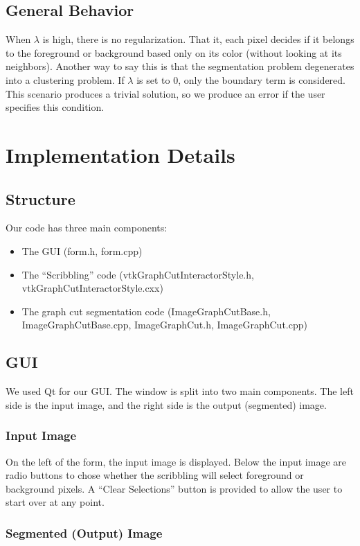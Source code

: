 \documentclass{InsightArticle}
\begin{document}
\subsection{General Behavior}
When $\lambda$ is high, there is no regularization. That it, each pixel decides if it belongs to the foreground or background based only on its color (without looking at its neighbors). Another way to say this is that the segmentation problem degenerates into a clustering problem. If $\lambda$ is set to $0$, only the boundary term is considered. This scenario produces a trivial solution, so we produce an error if the user specifies this condition.

\section{Implementation Details}
\subsection{Structure}
Our code has three main components: 
\begin{itemize}
\item The GUI (form.h, form.cpp)
\item The ``Scribbling'' code (vtkGraphCutInteractorStyle.h, vtkGraphCutInteractorStyle.cxx)
\item The graph cut segmentation code (ImageGraphCutBase.h, ImageGraphCutBase.cpp, ImageGraphCut.h, ImageGraphCut.cpp)
\end{itemize}
 
\subsection{GUI}
\label{subsec:GUI}
We used Qt for our GUI. The window is split into two main components. The left side is the input image, and the right side is the output (segmented) image.
\subsubsection{Input Image}
On the left of the form, the input image is displayed. Below the input image are radio buttons to chose whether the scribbling will select foreground or background pixels. A ``Clear Selections'' button is provided to allow the user to start over at any point.
\subsubsection{Segmented (Output) Image}
\end{document}
